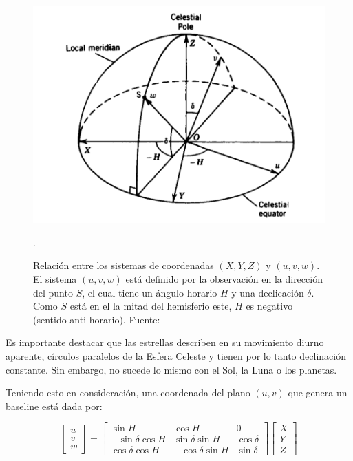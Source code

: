 \begin{figure}[h!]
	\centering
	\includegraphics[scale=0.3]{images/ecuatorial2.png}
	\caption{%
		Relación entre los sistemas de coordenadas $(X,Y,Z)$ y $(u,v,w)$. El sistema $(u,v,w)$ está definido por la observación en la dirección del punto $S$, el cual tiene un ángulo horario $H$ y una declicación $\delta$. Como $S$ está en el la mitad del hemisferio este, $H$ es negativo (sentido anti-horario). Fuente: \citep{libroAstro}}.
	\label{fig:ecuatorial2}
\end{figure}

Es importante destacar que las estrellas describen en su movimiento diurno aparente, círculos paralelos de la Esfera Celeste y tienen por lo tanto declinación constante. Sin embargo, no sucede lo mismo con el Sol, la Luna o los planetas.

Teniendo esto en consideración, una coordenada del plano $(u,v)$ que genera un baseline está dada por:

\begin{equation}
	\begin{bmatrix}
		u \\
		v \\
		w
	\end{bmatrix}
	=
	\begin{bmatrix}
		\sin{H}              & \cos{H}              & 0            \\
		-\sin{\delta}\cos{H} & \sin{\delta}\sin{H}  & \cos{\delta} \\
		\cos{\delta}\cos{H}  & -\cos{\delta}\sin{H} & \sin{\delta}
	\end{bmatrix}
	\begin{bmatrix}
		X \\
		Y \\
		Z
	\end{bmatrix}
	\label{eq:uvw}
\end{equation}


